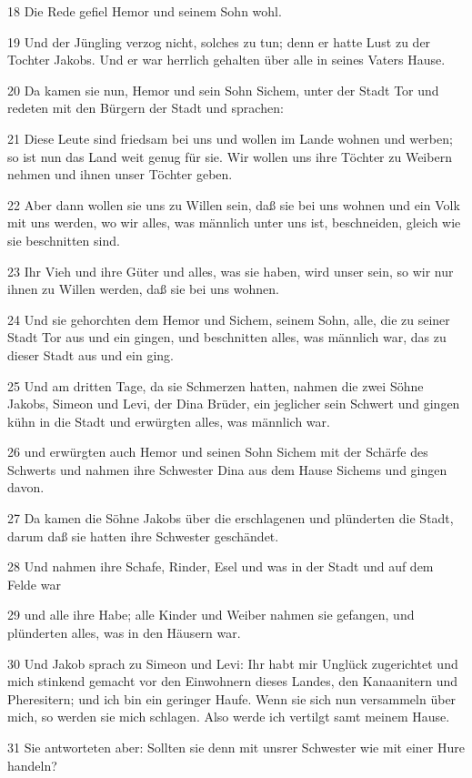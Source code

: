 \par 18 Die Rede gefiel Hemor und seinem Sohn wohl.
\par 19 Und der Jüngling verzog nicht, solches zu tun; denn er hatte Lust zu der Tochter Jakobs. Und er war herrlich gehalten über alle in seines Vaters Hause.
\par 20 Da kamen sie nun, Hemor und sein Sohn Sichem, unter der Stadt Tor und redeten mit den Bürgern der Stadt und sprachen:
\par 21 Diese Leute sind friedsam bei uns und wollen im Lande wohnen und werben; so ist nun das Land weit genug für sie. Wir wollen uns ihre Töchter zu Weibern nehmen und ihnen unser Töchter geben.
\par 22 Aber dann wollen sie uns zu Willen sein, daß sie bei uns wohnen und ein Volk mit uns werden, wo wir alles, was männlich unter uns ist, beschneiden, gleich wie sie beschnitten sind.
\par 23 Ihr Vieh und ihre Güter und alles, was sie haben, wird unser sein, so wir nur ihnen zu Willen werden, daß sie bei uns wohnen.
\par 24 Und sie gehorchten dem Hemor und Sichem, seinem Sohn, alle, die zu seiner Stadt Tor aus und ein gingen, und beschnitten alles, was männlich war, das zu dieser Stadt aus und ein ging.
\par 25 Und am dritten Tage, da sie Schmerzen hatten, nahmen die zwei Söhne Jakobs, Simeon und Levi, der Dina Brüder, ein jeglicher sein Schwert und gingen kühn in die Stadt und erwürgten alles, was männlich war.
\par 26 und erwürgten auch Hemor und seinen Sohn Sichem mit der Schärfe des Schwerts und nahmen ihre Schwester Dina aus dem Hause Sichems und gingen davon.
\par 27 Da kamen die Söhne Jakobs über die erschlagenen und plünderten die Stadt, darum daß sie hatten ihre Schwester geschändet.
\par 28 Und nahmen ihre Schafe, Rinder, Esel und was in der Stadt und auf dem Felde war
\par 29 und alle ihre Habe; alle Kinder und Weiber nahmen sie gefangen, und plünderten alles, was in den Häusern war.
\par 30 Und Jakob sprach zu Simeon und Levi: Ihr habt mir Unglück zugerichtet und mich stinkend gemacht vor den Einwohnern dieses Landes, den Kanaanitern und Pheresitern; und ich bin ein geringer Haufe. Wenn sie sich nun versammeln über mich, so werden sie mich schlagen. Also werde ich vertilgt samt meinem Hause.
\par 31 Sie antworteten aber: Sollten sie denn mit unsrer Schwester wie mit einer Hure handeln?

